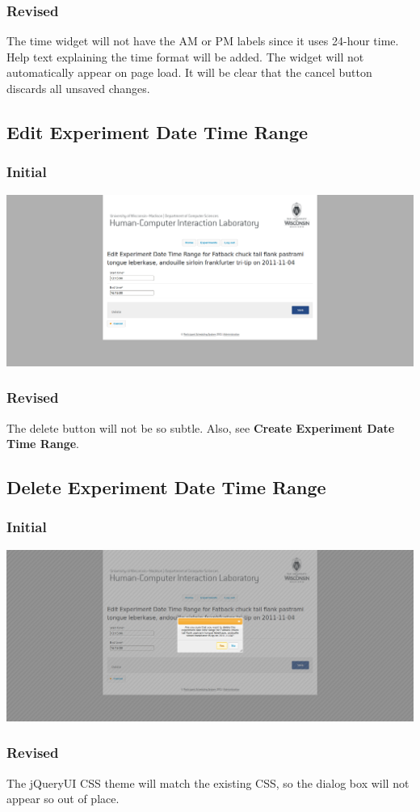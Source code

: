 \subsubsection{Revised}
The time widget will not have the AM or PM labels since it uses 24-hour time. Help text explaining the time format will be added. The widget will not automatically appear on page load. It will be clear that the cancel button discards all unsaved changes.

\subsection{Edit Experiment Date Time Range}
\subsubsection{Initial}
\includegraphics[width=6in]{../other/initial-interface-design/edit-experiment-date-time-range.png}
\subsubsection{Revised}
The delete button will not be so subtle. Also, see {\bf Create Experiment Date Time Range}.

\subsection{Delete Experiment Date Time Range}
\subsubsection{Initial}
\includegraphics[width=6in]{../other/initial-interface-design/delete-experiment-date-time-range.png}
\subsubsection{Revised}
The jQueryUI CSS theme will match the existing CSS, so the dialog box will not appear so out of place.
